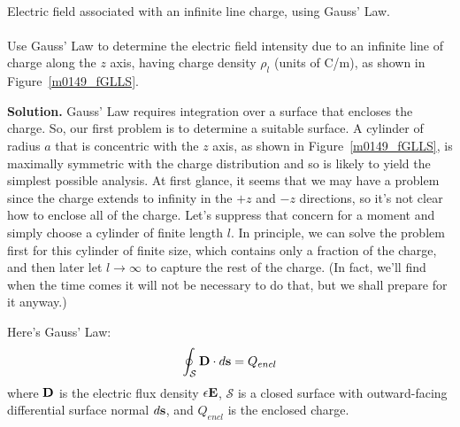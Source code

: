 ~\\ \begin{example} 
\begin{mdframed}[backgroundcolor=brown!20,linecolor=brown!20]\raggedright
Electric field associated with an infinite line charge, using Gauss' Law.
\\~\\
Use Gauss' Law to determine the electric field intensity due to an infinite line of charge along the $z$ axis, having charge density $\rho_l$ (units of C/m), as shown in Figure~\ref{m0149_fGLLS}.

{\bf Solution.}
Gauss' Law requires integration over a surface that encloses the charge.
So, our first problem is to determine a suitable surface.
A cylinder of radius $a$ that is concentric with the $z$ axis, as shown in Figure~\ref{m0149_fGLLS}, is maximally symmetric with the charge distribution and so is likely to yield the simplest possible analysis.
At first glance, it seems that we may have a problem since the charge extends to infinity in the $+z$ and $-z$ directions, so it's not clear how to enclose all of the charge. 
Let's suppress that concern for a moment and simply choose a cylinder of finite length $l$.
In principle, we can solve the problem first for this cylinder of finite size, which contains only a fraction of the charge, and then later let $l\to\infty$ to capture the rest of the charge.
(In fact, we'll find when the time comes it will not be necessary to do that, but we shall prepare for it anyway.)

Here's Gauss' Law:
%
\begin{equation}
\oint_{\mathcal S} {\bf D}\cdot d{\bf s} = Q_{encl}
\label{m0149_eGL}
\end{equation}
%
where 
${\bf D}$ is the electric flux density $\epsilon{\bf E}$,
${\mathcal S}$ is a closed surface with outward-facing differential surface normal $d{\bf s}$, and
$Q_{encl}$ is the enclosed charge.


\end{mdframed}
\end{example}
